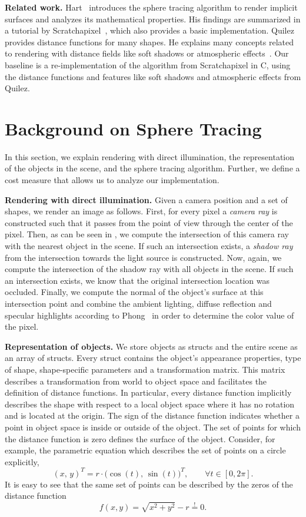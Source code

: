 \documentclass[letterpaper]{article}
\newcommand{\mypar}[1]{{\bf #1.}}
\begin{document}
\mypar{Related work} 
Hart~\cite{Hart1995} introduces the sphere tracing algorithm to render implicit surfaces and analyzes its mathematical properties.
His findings are summarized in a tutorial by Scratchapixel~\cite{scratchapixel}, which also provides a basic implementation.
Quilez~\cite{iquilezles:distfuncs} provides distance functions for many shapes. He explains many concepts related to rendering with distance fields like soft shadows or atmospheric effects~\cite{shadertoy:shadow+fog}.
Our baseline is a re-implementation of the algorithm from Scratchapixel in C, using the distance functions and features like soft shadows and atmospheric effects from Quilez.

\section{Background on Sphere Tracing}\label{sec:background}
In this section, we explain rendering with direct illumination, the representation of the objects in the scene, and the sphere tracing algorithm. Further, we define a cost measure that allows us to analyze our implementation.

\mypar{Rendering with direct illumination} Given a camera position and a set of shapes, we render an image as follows. First, for every pixel a \emph{camera ray} is constructed such that it passes from the point of view through the center of the pixel. Then, as can be seen in , we compute the intersection of this camera ray with the nearest object in the scene. If such an intersection exists, a \emph{shadow ray} from the intersection towards the light source is constructed. Now, again, we compute the intersection of the shadow ray with all objects in the scene. If such an intersection exists, we know that the original intersection location was occluded. Finally, we compute the normal of the object's surface at this intersection point and combine the ambient lighting, diffuse reflection and specular highlights according to Phong~\cite{Phong1975} in order to determine the color value of the pixel.

\mypar{Representation of objects} We store objects as structs and the entire scene as an array of structs. Every struct contains the object's appearance properties, type of shape, shape-specific parameters and a transformation matrix. This matrix describes a transformation from world to object space and facilitates the definition of distance functions. In particular, every distance function implicitly describes the shape with respect to a local object space where it has no rotation and is located at the origin. The sign of the distance function indicates whether a point in object space is inside or outside of the object. The set of points for which the distance function is zero defines the surface of the object. Consider, for example, the parametric equation which describes the set of points on a circle explicitly,
\[(x,\, y)^T = r \cdot \big( \cos(t), \, \sin(t) \big) ^T, \qquad \forall t \in [0, 2 \pi].\]
It is easy to see that the same set of points can be described by the zeros of the distance function
\[f(x,y) = \sqrt{x^2 + y^2} - r \stackrel{!}{=} 0.\]
\end{document}
